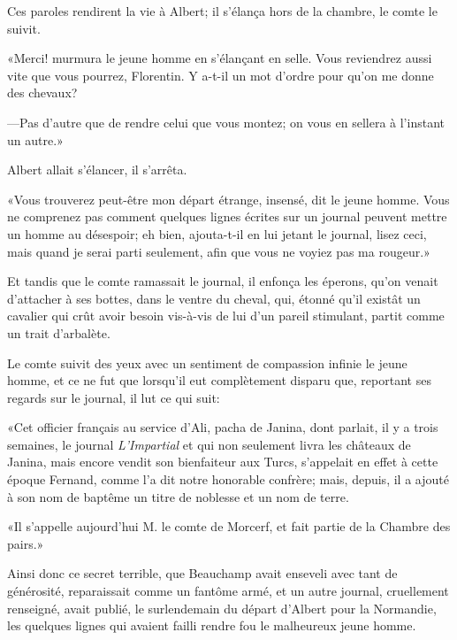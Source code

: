 Ces paroles rendirent la vie à Albert; il s'élança hors de la chambre, le comte le suivit. 

«Merci! murmura le jeune homme en s'élançant en selle. Vous reviendrez aussi vite que vous pourrez, Florentin. Y a-t-il un mot d'ordre pour qu'on me donne des chevaux? 

—Pas d'autre que de rendre celui que vous montez; on vous en sellera à l'instant un autre.» 

Albert allait s'élancer, il s'arrêta. 

«Vous trouverez peut-être mon départ étrange, insensé, dit le jeune homme. Vous ne comprenez pas comment quelques lignes écrites sur un journal peuvent mettre un homme au désespoir; eh bien, ajouta-t-il en lui jetant le journal, lisez ceci, mais quand je serai parti seulement, afin que vous ne voyiez pas ma rougeur.» 

Et tandis que le comte ramassait le journal, il enfonça les éperons, qu'on venait d'attacher à ses bottes, dans le ventre du cheval, qui, étonné qu'il existât un cavalier qui crût avoir besoin vis-à-vis de lui d'un pareil stimulant, partit comme un trait d'arbalète. 

Le comte suivit des yeux avec un sentiment de compassion infinie le jeune homme, et ce ne fut que lorsqu'il eut complètement disparu que, reportant ses regards sur le journal, il lut ce qui suit: 

«Cet officier français au service d'Ali, pacha de Janina, dont parlait, il y a trois semaines, le journal \textit{L'Impartial} et qui non seulement livra les châteaux de Janina, mais encore vendit son bienfaiteur aux Turcs, s'appelait en effet à cette époque Fernand, comme l'a dit notre honorable confrère; mais, depuis, il a ajouté à son nom de baptême un titre de noblesse et un nom de terre. 

«Il s'appelle aujourd'hui M. le comte de Morcerf, et fait partie de la Chambre des pairs.» 

Ainsi donc ce secret terrible, que Beauchamp avait enseveli avec tant de générosité, reparaissait comme un fantôme armé, et un autre journal, cruellement renseigné, avait publié, le surlendemain du départ d'Albert pour la Normandie, les quelques lignes qui avaient failli rendre fou le malheureux jeune homme. 